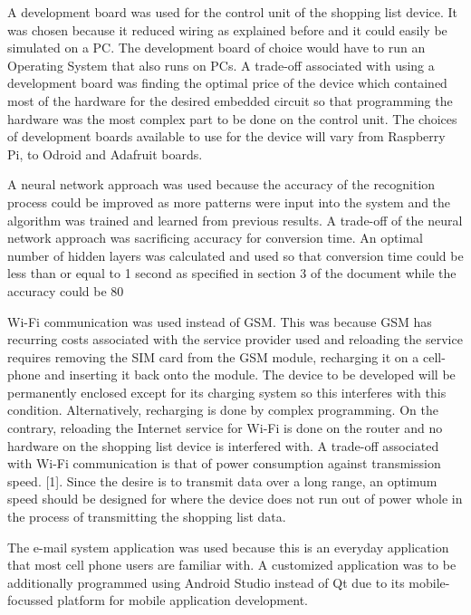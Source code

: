 A development board was used for the control unit of the shopping list device. It was chosen because it reduced wiring as explained before and it could easily be simulated on a PC. The development board of choice would have to run an Operating System that also runs on PCs. A trade-off associated with using a development board was finding the optimal price of the device which contained most of the hardware for the desired embedded circuit so that programming the hardware was the most complex part to be done on the control unit. The choices of development boards available to use for the device will vary from Raspberry Pi, to Odroid and Adafruit boards.

A neural network approach was used because the accuracy of the recognition process could be improved as more patterns were input into the system and the algorithm was trained and learned from previous results. A trade-off of the neural network approach was sacrificing accuracy for conversion time. An optimal number of hidden layers was calculated and used so that conversion time could be less than or equal to 1 second as specified in section 3 of the document while the accuracy could be 80%

Wi-Fi communication was used instead of GSM. This was because GSM has recurring costs associated with the service provider used and reloading the service requires removing the SIM card from the GSM module, recharging it on a cell-phone and inserting it back onto the module. The device to be developed will be permanently enclosed except for its charging system so this interferes with this condition. Alternatively, recharging is done by complex programming. On the contrary, reloading the Internet service for Wi-Fi is done on the router and no hardware on the shopping list device is interfered with. A trade-off associated with Wi-Fi communication is that of power consumption against transmission speed. [1]. Since the desire is to transmit data over a long range, an optimum speed should be designed for where the device does not run out of power whole in the process of transmitting the shopping list data.

The e-mail system application was used because this is an everyday application that most cell phone users are familiar with. A customized application was to be additionally programmed using Android Studio instead of Qt due to its mobile-focussed platform for mobile application development.

\newpage


